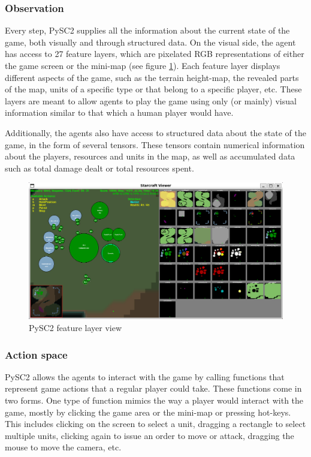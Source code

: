 \subsubsection*{Observation}

Every step, PySC2 supplies all the information about the current state of the game, both visually and through structured data. On the visual side, the agent has access to 27 feature layers, which are pixelated RGB representations of either the game screen or the mini-map (see figure \ref{fig:feature_layers}). Each feature layer displays different aspects of the game, such as the terrain height-map, the revealed parts of the map, units of a specific type or that belong to a specific player, etc. These layers are meant to allow agents to play the game using only (or mainly) visual information similar to that which a human player would have.

Additionally, the agents also have access to structured data about the state of the game, in the form of several tensors. These tensors contain numerical information about the players, resources and units in the map, as well as accumulated data such as total damage dealt or total resources spent.

\begin{figure}[t]
    \centering
    \includegraphics[width=1\textwidth]{figs/feature_layers.png}
    \caption{PySC2 feature layer view}
    \label{fig:feature_layers}
\end{figure}

\subsubsection*{Action space}

PySC2 allows the agents to interact with the game by calling functions that represent game actions that a regular player could take. These functions come in two forms. One type of function mimics the way a player would interact with the game, mostly by clicking the game area or the mini-map or pressing hot-keys. This includes clicking on the screen to select a unit, dragging a rectangle to select multiple units, clicking again to issue an order to move or attack, dragging the mouse to move the camera, etc.

